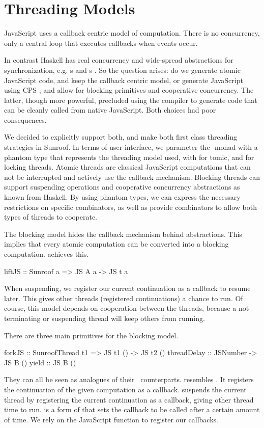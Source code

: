  
\section{Threading Models}
\label{sec:threading-models}

JavaScript uses a callback centric model of computation. There
is no concurrency, only a central loop that executes callbacks
when events occur.

In contrast Haskell has real concurrency and wide-spread 
abstractions for synchronization, e.g. s and s
\cite{Jones:96:ConcurrentHaskell}.
So the question arises: do we generate atomic JavaScript code, 
and keep the callback centric model, or generate JavaScript
using CPS \cite{Claessen:99:PoorMansConcurrencyMonad}, 
and allow for blocking primitives and
cooperative concurrency. The latter, though more powerful, 
precluded using the compiler to generate
code that can be cleanly called from native JavaScript.
Both choices had poor consequences.

We decided to explicitly support both,
and make both first class threading strategies in Sunroof.
In terms of user-interface, we parameter the \JS-monad
with a phantom type that represents the threading model used, 
with  for tomic,
and  for locking threads. 
Atomic threads are classical JavaScript computations that
can not be interrupted and actively use the callback
mechanism. Blocking threads can
support suspending operations and cooperative concurrency
abstractions as known from Haskell. By using phantom
types, we can express the necessary
restrictions on specific combinators, as well
as provide combinators to allow both types of
threads to cooperate.

The blocking model hides the callback mechanism behind abstractions.
This implies that every atomic computation can be converted into 
a blocking computation.  achieves this.
\begin{Code}
liftJS :: Sunroof a => JS A a -> JS t a
\end{Code}

When suspending, we register our current
continuation as a callback to resume later. This gives other 
threads (registered continuations) a chance to run.
Of course, this model depends on cooperation between the threads,
because a not terminating or suspending thread will keep others from running.

There are three main primitives for the blocking model.
\begin{Code}
forkJS      :: SunroofThread t1 => JS t1 () -> JS t2 ()
threadDelay :: JSNumber -> JS B ()
yield       :: JS B ()
\end{Code}
They can all be seen as analogues of their \IO~counterparts.
 resembles .
It registers the continuation of the given computation as a callback. 
 suspends the current thread by 
registering the current continuation as a callback,
giving other thread time to run.
 is a form of  that sets 
the callback to be called after a certain amount of time.
We rely on the JavaScript function  
\cite{whatwg:timers} to register our callbacks.


